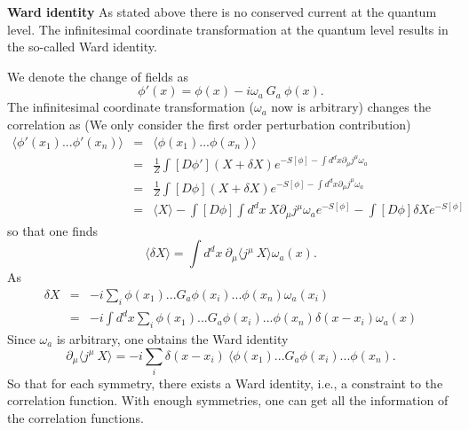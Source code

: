 \documentclass[submission, PhysLectNotes]{SciPost}
\begin{document}
{\bf Ward identity}
As stated above there is no conserved current at the quantum level. The infinitesimal coordinate transformation at the quantum level results in the so-called Ward identity.

We denote the change of fields as
\begin{equation}
    \phi'(x) = \phi(x) -i\omega_a\ G_a\ \phi(x).
\end{equation}
The infinitesimal coordinate transformation ($\omega_a$ now is arbitrary) changes the correlation as (We only consider the first order perturbation contribution)
\begin{eqnarray}
\langle \phi'(x_1)... \phi'(x_n)\rangle &=& \langle \phi(x_1)... \phi(x_n)\rangle \\
&=& \frac{1}{Z} \int [D\phi'] (X+\delta X) e^{-S[\phi] - \int d^dx\partial_\mu j^\mu \omega_a} \\
&=& \frac{1}{Z} \int [D\phi] (X+\delta X) e^{-S[\phi] - \int d^dx\partial_\mu j^\mu \omega_a} \\
&=& \langle X \rangle - \int [D\phi] \int d^dx\ X \partial_\mu j^\mu \omega_a e^{-S[\phi]} - \int [D\phi] \delta X  e^{-S[\phi]}
\end{eqnarray}
so that one finds
\begin{equation}
    \langle\delta X\rangle = \int d^dx \ \partial_\mu\langle j^\mu \ X\rangle \omega_a(x).
\end{equation}
As
\begin{eqnarray}
\delta X &=& -i \sum_i \phi(x_1)...G_a \phi(x_i)...\phi(x_n)\omega_a(x_i) \\
&=& -i \int d^dx \sum_i \phi(x_1)...G_a \phi(x_i)...\phi(x_n)\delta(x-x_i)\omega_a(x)
\end{eqnarray}
Since $\omega_a$ is arbitrary, one obtains the Ward identity
\begin{equation}
    \partial_\mu\langle j^\mu \ X\rangle = -i \sum_i \delta(x-x_i)\ \langle \phi(x_1)...G_a \phi(x_i)...\phi(x_n).
\end{equation}
So that for each symmetry, there exists a Ward identity, i.e., a constraint to the correlation function. With enough symmetries, one can get all the information of the correlation functions.
\end{document}

